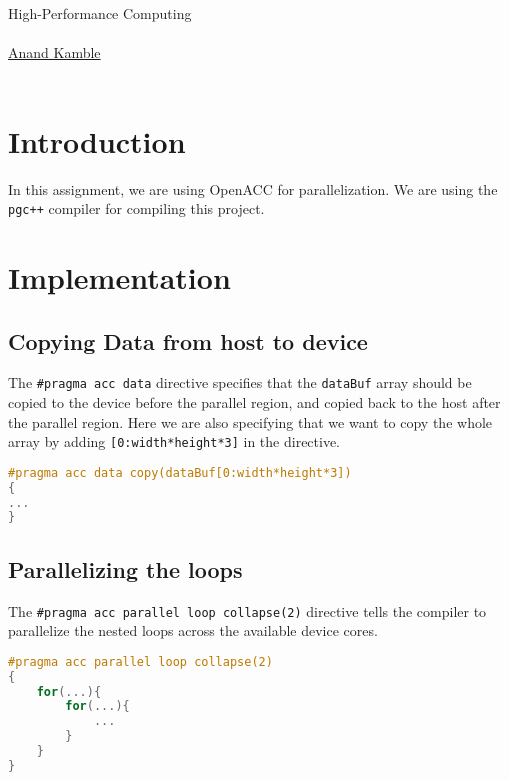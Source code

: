 \documentclass{article}
\begin{document}
\begin{center}

{\textcolor{RedOrange}{High-Performance Computing}} \\
\vspace{0.5em}
 \\
\vspace{1em}
\href{mailto:amk23j@fsu.edu}{Anand Kamble}\\
 \\
\end{center}

\noindent
\hrulefill

\section{Introduction}
In this assignment, we are using OpenACC for parallelization. We are using the \texttt{pgc++} compiler for compiling this project.

\section{Implementation}
\subsection{Copying Data from host to device}
The \texttt{\#pragma acc data} directive specifies that the \texttt{dataBuf} array should be copied to the device before the parallel region, and copied back to the host after the parallel region. Here we are also specifying that we want to copy the whole array by adding \texttt{[0:width*height*3]} in the directive.

\begin{lstlisting}[language=C++,caption={Grouping Kernel with Shared Memory}, label={lst:1},firstnumber=25]
#pragma acc data copy(dataBuf[0:width*height*3])
{
...
}
\end{lstlisting}

\subsection{Parallelizing the loops}
The \texttt{\#pragma acc parallel loop collapse(2)} directive tells the compiler to parallelize the nested loops across the available device cores.

\begin{lstlisting}[language=C++,caption={Grouping Kernel with Shared Memory}, label={lst:1},firstnumber=25]
#pragma acc parallel loop collapse(2)
{
    for(...){
        for(...){
            ...
        }
    }
}
\end{lstlisting}
\end{document}

